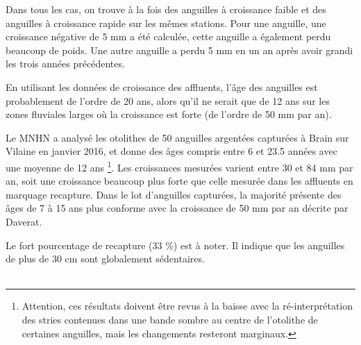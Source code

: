 \documentclass[10pt,twocolumn,titlepage,twoside]{article}\usepackage[]{graphicx}\usepackage[]{color}
\begin{document}
Dans tous les cas,  on
trouve à la fois des anguilles à croissance faible et des anguilles à croissance
rapide sur les mêmes stations. Pour une anguille, une croissance négative de 5
mm a été calculée, cette anguille a également perdu beaucoup de poids. Une autre
anguille a perdu 5 mm en un an après avoir grandi les trois années précédentes.

En utilisant les données de croissance des affluents, l'âge des anguilles est
probablement de l'ordre de 20 ans, alors qu'il ne serait que de 12 ans sur les
zones fluviales larges où la croissance est forte (de l'ordre de 50 mm par an). 

Le MNHN a analysé les otolithes de 50 anguilles argentées capturées à
Brain sur Vilaine en janvier 2016, et donne des âges compris entre 6 et 23.5
années avec une moyenne de 12 ans \footnote{Attention, ces résultats doivent être revus à la baisse avec
la ré-interprétation des stries contenues dans une bande sombre au centre de l'otolithe de certaines anguilles, mais les changements resteront marginaux.}. Les croissances mesurées varient entre 30 et 84
mm par an, soit une croissance beaucoup plus forte que celle mesurée dans les
affluents en marquage recapture. Dans le lot d'anguilles capturées, la majorité
présente des âges de 7 à 15 ans plus conforme avec la croissance de 50 mm par an
décrite par Daverat.


Le fort pourcentage de recapture (33 \%) est à noter.
Il indique que les anguilles de plus de 30 cm sont globalement
sédentaires.\\ 

 \\ \mediumskip
\end{document}
